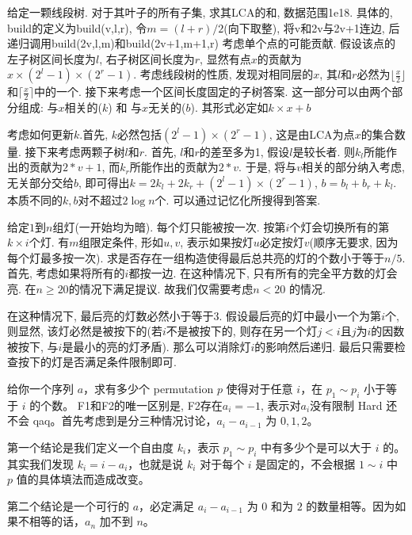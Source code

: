 \prob 给定一颗线段树. 对于其叶子的所有子集, 求其LCA的和, 数据范围1e18. 具体的, build的定义为build(v,l,r), 令$m = (l+r)/2$(向下取整), 将v和2v与2v+1连边, 后递归调用build(2v,l,m)和build(2v+1,m+1,r)
\sol  考虑单个点的可能贡献. 假设该点的左子树区间长度为$l$, 右子树区间长度为$r$, 显然有点$x$的贡献为$x \times (2^l - 1) \times (2^r - 1)$. 考虑线段树的性质, 发现对相同层的$x$, 其$l$和$r$必然为$\lfloor{\frac{x}{2}}\rfloor$和$\lceil{\frac{x}{2}}\rceil$中的一个. 接下来考虑一个区间长度固定的子树答案. 这一部分可以由两个部分组成: 与$x$相关的($k$) 和 与$x$无关的($b$). 其形式必定如$k\times x + b$

考虑如何更新$k$.首先, $k$必然包括$(2^l-1) \times (2^r - 1)$, 这是由LCA为点$x$的集合数量. 接下来考虑两颗子树$l$和$r$. 首先, $l$和$r$的差至多为1, 假设$l$是较长者. 则$k_l$所能作出的贡献为$2 * v + 1$, 而$k_r$所能作出的贡献为$2 * v$. 于是, 将与$v$相关的部分纳入考虑, 无关部分交给$b$, 即可得出$k = 2k_l + 2k_r + (2^{l}-1) \times (2^{r} - 1)$, $b = b_l + b_r + k_l$. 本质不同的$k,b$对不超过$2\log{n}$个. 可以通过记忆化所搜得到答案.

\prob 给定$1$到$n$组灯(一开始均为暗). 每个灯只能被按一次. 按第$i$个灯会切换所有的第$k \times i$个灯. 有$m$组限定条件, 形如$u, v$, 表示如果按灯$u$必定按灯$v$(顺序无要求, 因为每个灯最多按一次). 求是否存在一组构造使得最后总共亮的灯的个数小于等于$n / 5$.
\sol 首先, 考虑如果将所有的$i$都按一边. 在这种情况下, 只有所有的完全平方数的灯会亮. 在$n \geq 20$的情况下满足提议. 故我们仅需要考虑$n < 20$ 的情况.

在这种情况下, 最后亮的灯数必然小于等于$3$. 假设最后亮的灯中最小一个为第$i$个, 则显然, 该灯必然是被按下的(若$i$不是被按下的, 则存在另一个灯$j < i$且$j$为$i$的因数被按下, 与$i$是最小的亮的灯矛盾). 那么可以消除灯$i$的影响然后递归. 最后只需要检查按下的灯是否满足条件限制即可.

\prob 给你一个序列 $a$，求有多少个 permutation $p$ 使得对于任意 $i$，在 $p_1\sim p_i$ 小于等于 $i$ 的个数。 F1和F2的唯一区别是, F2存在$a_i = -1$, 表示对$a_i$没有限制
\sol Hard 还不会 qaq。首先考虑到是分三种情况讨论，$a_i-a_{i-1}$ 为 $0, 1, 2$。

第一个结论是我们定义一个自由度 $k_i$，表示 $p_1\sim p_i$ 中有多少个是可以大于 $i$ 的。其实我们发现 $k_i=i-a_i$，也就是说 $k_i$ 对于每个 $i$ 是固定的，不会根据 $1\sim i$ 中 $p$ 值的具体填法而造成改变。

第二个结论是一个可行的 $a$，必定满足 $a_i-a_{i-1}$ 为 $0$ 和为 $2$ 的数量相等。因为如果不相等的话，$a_n$ 加不到 $n$。

